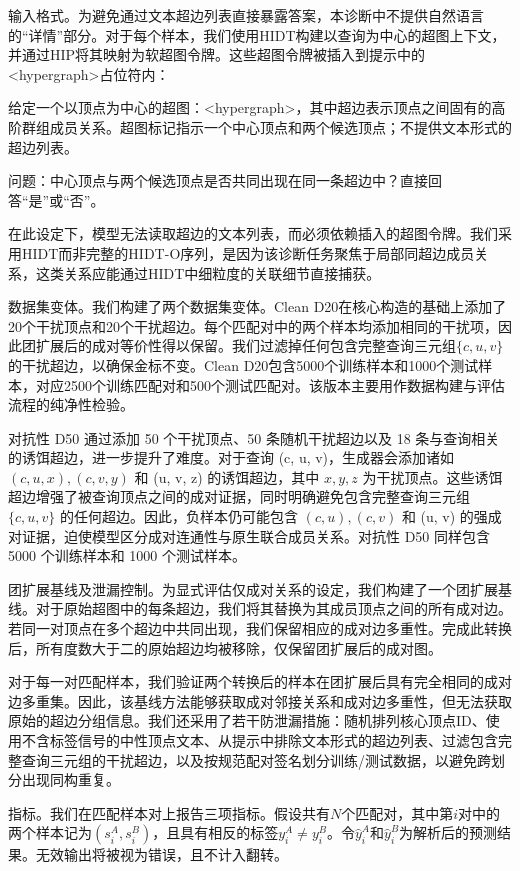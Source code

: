 \documentclass[10pt]{article}
\begin{document}
输入格式。为避免通过文本超边列表直接暴露答案，本诊断中不提供自然语言的“详情”部分。对于每个样本，我们使用HIDT构建以查询为中心的超图上下文，并通过HIP将其映射为软超图令牌。这些超图令牌被插入到提示中的<hypergraph>占位符内：

给定一个以顶点为中心的超图：<hypergraph>，其中超边表示顶点之间固有的高阶群组成员关系。超图标记指示一个中心顶点和两个候选顶点；不提供文本形式的超边列表。

问题：中心顶点与两个候选顶点是否共同出现在同一条超边中？直接回答“是”或“否”。

在此设定下，模型无法读取超边的文本列表，而必须依赖插入的超图令牌。我们采用HIDT而非完整的HIDT-O序列，是因为该诊断任务聚焦于局部同超边成员关系，这类关系应能通过HIDT中细粒度的关联细节直接捕获。

数据集变体。我们构建了两个数据集变体。Clean D20在核心构造的基础上添加了20个干扰顶点和20个干扰超边。每个匹配对中的两个样本均添加相同的干扰项，因此团扩展后的成对等价性得以保留。我们过滤掉任何包含完整查询三元组\(\{ c,u,v\}\)的干扰超边，以确保金标不变。Clean D20包含5000个训练样本和1000个测试样本，对应2500个训练匹配对和500个测试匹配对。该版本主要用作数据构建与评估流程的纯净性检验。

对抗性 D50 通过添加 50 个干扰顶点、50 条随机干扰超边以及 18 条与查询相关的诱饵超边，进一步提升了难度。对于查询 (c, u, v)，生成器会添加诸如 \(\left( {c,u,x}\right) ,\left( {c,v,y}\right)\) 和 (u, v, z) 的诱饵超边，其中 \(x,y,z\) 为干扰顶点。这些诱饵超边增强了被查询顶点之间的成对证据，同时明确避免包含完整查询三元组 \(\{ c,u,v\}\) 的任何超边。因此，负样本仍可能包含 \(\left( {c,u}\right) ,\left( {c,v}\right)\) 和 (u, v) 的强成对证据，迫使模型区分成对连通性与原生联合成员关系。对抗性 D50 同样包含 5000 个训练样本和 1000 个测试样本。

团扩展基线及泄漏控制。为显式评估仅成对关系的设定，我们构建了一个团扩展基线。对于原始超图中的每条超边，我们将其替换为其成员顶点之间的所有成对边。若同一对顶点在多个超边中共同出现，我们保留相应的成对边多重性。完成此转换后，所有度数大于二的原始超边均被移除，仅保留团扩展后的成对图。

对于每一对匹配样本，我们验证两个转换后的样本在团扩展后具有完全相同的成对边多重集。因此，该基线方法能够获取成对邻接关系和成对边多重性，但无法获取原始的超边分组信息。我们还采用了若干防泄漏措施：随机排列核心顶点ID、使用不含标签信号的中性顶点文本、从提示中排除文本形式的超边列表、过滤包含完整查询三元组的干扰超边，以及按规范配对签名划分训练/测试数据，以避免跨划分出现同构重复。

指标。我们在匹配样本对上报告三项指标。假设共有\(N\)个匹配对，其中第\(i\)对中的两个样本记为\(\left( {{s}_{i}^{A},{s}_{i}^{B}}\right)\)，且具有相反的标签\({y}_{i}^{A} \neq{y}_{i}^{B}\)。令\({\widehat{y}}_{i}^{A}\)和\({\widehat{y}}_{i}^{B}\)为解析后的预测结果。无效输出将被视为错误，且不计入翻转。
\end{document}
